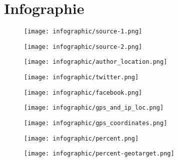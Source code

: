 \documentclass[runningheads]{llncs}
\begin{document}
\begin{appendix}
\begin{itemize}
\end{itemize}

\section{Infographie}
\label{appendix:graphs}
\begin{figure}
    \centering
    \texttt{[image: infographic/source-1.png]}

\end{figure}

\begin{figure}
    \centering
    \texttt{[image: infographic/source-2.png]}

\end{figure}

\begin{figure}
    \centering
    \centerline{\texttt{[image: infographic/author\_location.png]}}

\end{figure}

\begin{figure}
    \centering
    \texttt{[image: infographic/twitter.png]}

\end{figure}

\begin{figure}
    \centering
    \texttt{[image: infographic/facebook.png]}

\end{figure}

\begin{figure}
    \centering
    \texttt{[image: infographic/gps\_and\_ip\_loc.png]}

\end{figure}

\begin{figure}
    \centering
    \texttt{[image: infographic/gps\_coordinates.png]}

\end{figure}


\begin{figure}
    \centering
    \texttt{[image: infographic/percent.png]}

\end{figure}

\begin{figure}
    \centering
    \texttt{[image: infographic/percent-geotarget.png]}
    

\end{figure}
\end{appendix}
\end{document}
